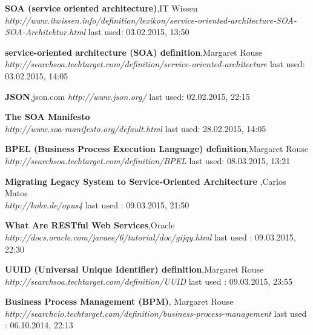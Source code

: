 \documentclass[12pt]{article}
\begin{document}
\begin{thebibliography}{56}
     
   \textbf{SOA (service oriented architecture)},IT Wissen \\
  \textit{http://www.itwissen.info/definition/lexikon/service-oriented-architecture-SOA-SOA-Architektur.html}
  \newline last used: 03.02.2015, 13:50
     
   \textbf{service-oriented architecture (SOA) definition},Margaret Rouse \\
  \textit{http://searchsoa.techtarget.com/definition/service-oriented-architecture}
  \newline last used: 03.02.2015, 14:05

  \textbf{JSON},json.com
  \textit{http://www.json.org/}
  \newline last used: 02.02.2015, 22:15

 
   \textbf{The SOA Manifesto} \\
  \textit{http://www.soa-manifesto.org/default.html}
  \newline last used: 28.02.2015, 14:05


   \textbf{BPEL (Business Process Execution Language) definition},Margaret Rouse \\
  \textit{http://searchsoa.techtarget.com/definition/BPEL}
  \newline last used: 08.03.2015, 13:21

    \textbf{Migrating Legacy System to Service-Oriented Architecture },Carlos Matos\\
    \textit{http://kobv.de/opus4}
    \newline last used : 09.03.2015, 21:50

    \textbf{What Are RESTful Web Services},Oracle
    \textit{http://docs.oracle.com/javaee/6/tutorial/doc/gijqy.html}
    \newline last used : 09.03.2015, 22:30

    \textbf{UUID (Universal Unique Identifier) definition},Margaret Rouse\\
    \textit{http://searchsoa.techtarget.com/definition/UUID}
    \newline last used : 09.03.2015, 23:55

   \textbf{Business Process Management (BPM)}, Margaret Rouse\\
  \emph{http://searchcio.techtarget.com/definition/business-process-management}
  \newline last used : 06.10.2014, 22:13
  


\end{thebibliography}
\end{document}
